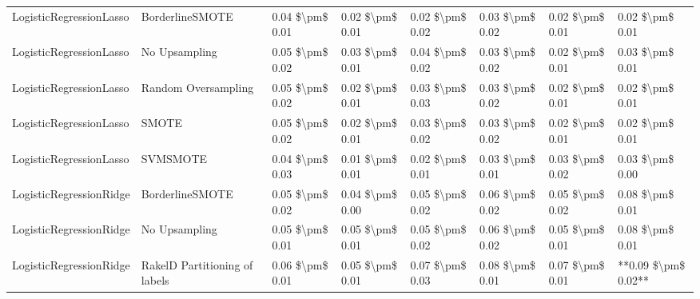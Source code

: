 \begin{tabular}{llllllll}
        LogisticRegressionLasso &               BorderlineSMOTE & 0.04 \$\textbackslash pm\$ 0.01 &           0.02 \$\textbackslash pm\$ 0.01 &       0.02 \$\textbackslash pm\$ 0.02 &        0.03 \$\textbackslash pm\$ 0.02 &                         0.02 \$\textbackslash pm\$ 0.01 &     0.02 \$\textbackslash pm\$ 0.01 \\
        LogisticRegressionLasso &                 No Upsampling & 0.05 \$\textbackslash pm\$ 0.02 &           0.03 \$\textbackslash pm\$ 0.01 &       0.04 \$\textbackslash pm\$ 0.02 &        0.03 \$\textbackslash pm\$ 0.02 &                         0.02 \$\textbackslash pm\$ 0.01 &     0.03 \$\textbackslash pm\$ 0.01 \\
        LogisticRegressionLasso &           Random Oversampling & 0.05 \$\textbackslash pm\$ 0.02 &           0.02 \$\textbackslash pm\$ 0.01 &       0.03 \$\textbackslash pm\$ 0.03 &        0.03 \$\textbackslash pm\$ 0.02 &                         0.02 \$\textbackslash pm\$ 0.01 &     0.02 \$\textbackslash pm\$ 0.01 \\
        LogisticRegressionLasso &                         SMOTE & 0.05 \$\textbackslash pm\$ 0.02 &           0.02 \$\textbackslash pm\$ 0.01 &       0.03 \$\textbackslash pm\$ 0.02 &        0.03 \$\textbackslash pm\$ 0.02 &                         0.02 \$\textbackslash pm\$ 0.01 &     0.02 \$\textbackslash pm\$ 0.01 \\
        LogisticRegressionLasso &                      SVMSMOTE & 0.04 \$\textbackslash pm\$ 0.03 &           0.01 \$\textbackslash pm\$ 0.01 &       0.02 \$\textbackslash pm\$ 0.01 &        0.03 \$\textbackslash pm\$ 0.01 &                         0.03 \$\textbackslash pm\$ 0.02 &     0.03 \$\textbackslash pm\$ 0.00 \\
        LogisticRegressionRidge &               BorderlineSMOTE & 0.05 \$\textbackslash pm\$ 0.02 &           0.04 \$\textbackslash pm\$ 0.00 &       0.05 \$\textbackslash pm\$ 0.02 &        0.06 \$\textbackslash pm\$ 0.02 &                         0.05 \$\textbackslash pm\$ 0.02 &     0.08 \$\textbackslash pm\$ 0.01 \\
        LogisticRegressionRidge &                 No Upsampling & 0.05 \$\textbackslash pm\$ 0.01 &           0.05 \$\textbackslash pm\$ 0.01 &       0.05 \$\textbackslash pm\$ 0.02 &        0.06 \$\textbackslash pm\$ 0.02 &                         0.05 \$\textbackslash pm\$ 0.01 &     0.08 \$\textbackslash pm\$ 0.01 \\
        LogisticRegressionRidge & RakelD Partitioning of labels & 0.06 \$\textbackslash pm\$ 0.01 &           0.05 \$\textbackslash pm\$ 0.01 &       0.07 \$\textbackslash pm\$ 0.03 &        0.08 \$\textbackslash pm\$ 0.01 &                         0.07 \$\textbackslash pm\$ 0.01 & **0.09 \$\textbackslash pm\$ 0.02** \\

\end{tabular}
